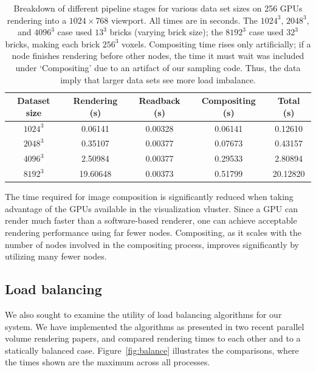 \begin{table}
	\begin{tabular}{|c|ccc|c|}\hline
	\textbf{Dataset size} & \textbf{Rendering (s)} & \textbf{Readback (s)} &
		\textbf{Compositing (s)} & \textbf{Total (s)}\\\hline
	$1024^3$ &  0.06141 & 0.00328 & 0.06141 &  0.12610 \\
	$2048^3$ &  0.35107 & 0.00377 & 0.07673 &  0.43157 \\
	$4096^3$ &  2.50984 & 0.00377 & 0.29533 &  2.80894 \\
	$8192^3$ & 19.60648 & 0.00373 & 0.51799 & 20.12820 \\\hline
	\end{tabular}

  \caption{Breakdown of different pipeline stages for various data set
  sizes on 256 GPUs rendering into a $1024 \times 768$ viewport.  All
  times are in seconds.  The $1024^3$, $2048^3$, and $4096^3$ case used
  $13^3$ bricks (varying brick size); the $8192^3$ case used $32^3$
  bricks, making each brick $256^3$ voxels.  Compositing time rises
  only artificially; if a node finishes rendering before other nodes,
  the time it must wait was included under `Compositing' due to an
  artifact of our sampling code.  Thus, the data imply that larger data
  sets see more load imbalance.}

	\label{tbl:breakdown}
\end{table}

The time required for image composition is significantly reduced when
taking advantage of the GPUs available in the visualization vluster.
Since a GPU can render much faster than a software-based renderer, one
can achieve acceptable rendering performance using far fewer nodes.
Compositing, as it scales with the number of nodes involved in the
compositing process, improves significantly by utilizing many fewer
nodes.

\subsection{Load balancing}

We also sought to examine the utility of load balancing algorithms for
our system. We have implemented the algorithms as presented in two
recent parallel volume rendering papers, and compared rendering times
to each other and to a
statically balanced case.  Figure~\ref{fig:balance} illustrates
the comparisons, where the times shown are the maximum across all
processes.

